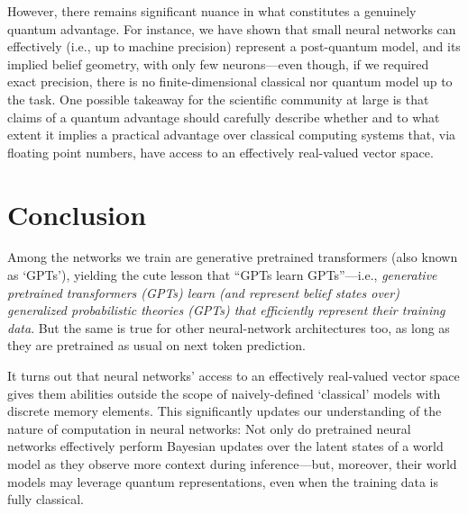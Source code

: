 \documentclass[prx,nofootinbib,onecolumn,showkeys,groupaddress,preprintnumbers,floatfix,
superscriptaddress]{revtex4-1}
\begin{document}
However, there remains significant nuance in what constitutes a genuinely quantum advantage.
For instance, we have shown that small neural networks can effectively (i.e., up to machine precision) represent a post-quantum model, and its implied belief geometry, with only few neurons---even though, if we required exact precision, there is no finite-dimensional classical nor quantum model up to the task.
One possible 
takeaway for the scientific community at large is 
that 
claims of 
a quantum advantage should carefully 
describe whether and to what extent it implies a practical advantage over classical computing systems that, via floating point numbers, have access to an effectively real-valued vector space.








\section{Conclusion}

Among the networks we train are generative pretrained transformers (also known as `GPTs'), 
yielding the cute lesson that ``GPTs learn GPTs''---i.e., \emph{generative pretrained transformers (GPTs) learn (and represent belief states over) generalized probabilistic theories (GPTs)
that efficiently represent their training data}.
But the same is true for other neural-network architectures too, as long as they are pretrained as usual on 
next token prediction.

%
It turns out that neural networks' access to an effectively real-valued vector space gives them abilities outside the scope
of naively-defined 
`classical' models with discrete memory elements.
% 
This significantly updates our understanding of the nature of computation in neural networks:
Not only do pretrained neural networks effectively perform Bayesian updates over the latent states of a world model as they observe more context during inference---but, moreover, their world models may leverage quantum representations, even when the training data is fully classical. 
\end{document}
